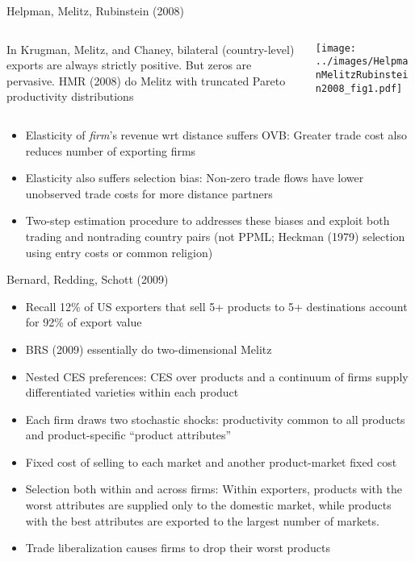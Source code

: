\documentclass[10pt,notes=hide]{beamer}
\begin{document}
\begin{frame}{Helpman, Melitz, Rubinstein (2008)}
\begin{columns}
\begin{column}{.4\textwidth}
In Krugman, Melitz, and Chaney, bilateral (country-level) exports are always strictly positive. But zeros are pervasive.
HMR (2008) do Melitz with truncated Pareto productivity distributions 
\end{column}
\begin{column}{.6\textwidth}
\texttt{[image: ../images/HelpmanMelitzRubinstein2008\_fig1.pdf]}
\end{column}
\end{columns}
\begin{itemize}
	\item Elasticity of \textit{firm}'s revenue wrt distance suffers OVB: 
	Greater trade cost also reduces number of exporting firms
	\item Elasticity also suffers selection bias: 
	Non-zero trade flows have lower unobserved trade costs for more distance partners
	\item Two-step estimation procedure to addresses these biases and exploit both trading and nontrading country pairs (not PPML; Heckman (1979) selection using entry costs or common religion)
\end{itemize}
\end{frame}
\begin{frame}{Bernard, Redding, Schott (2009)}
\begin{itemize}
	\item Recall 12\% of US exporters that sell 5+ products to 5+ destinations account for 92\% of export value
	\item BRS (2009) essentially do two-dimensional Melitz
	\item Nested CES preferences: CES over products and a continuum of firms supply differentiated varieties within each product
	\item Each firm draws two stochastic shocks: productivity common to all products and product-specific ``product attributes''
	\item Fixed cost of selling to each market and another product-market fixed cost
	\item Selection both within and across firms: Within exporters, products with the worst attributes are supplied only to the domestic market, while products with the best attributes are exported to the largest number of markets.
	\item Trade liberalization causes firms to drop their worst products
\end{itemize}
\end{frame}
\end{document}

